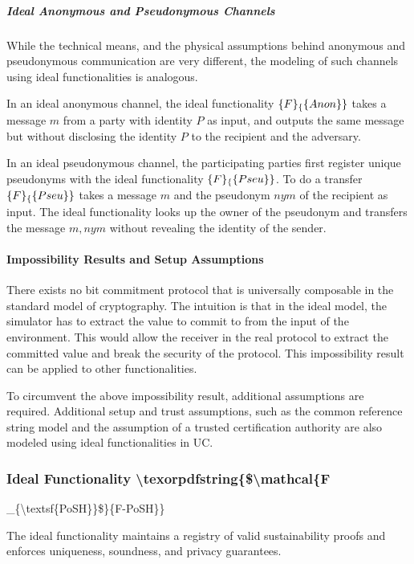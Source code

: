 \documentclass{article}
\begin{document}
\subparagraph{Ideal Anonymous and Pseudonymous Channels}

While the technical means, and the physical assumptions behind anonymous and
pseudonymous communication are very different, the modeling of such channels
using ideal functionalities is analogous.

In an ideal anonymous channel, the ideal functionality $\mathcal\{F\}_\{\mathsf\{Anon\}\}$
takes a message $m$ from a party with identity $P$ as input, and outputs the
same message but without disclosing the identity $P$ to the recipient and the
adversary.

In an ideal pseudonymous channel, the participating parties first register
unique pseudonyms with the ideal functionality $\mathcal\{F\}_\{\mathsf\{Pseu\}\}$. To
do a transfer $\mathcal\{F\}_\{\mathsf\{Pseu\}\}$ takes a message $m$ and the
pseudonym $nym$ of the recipient as input. The ideal functionality looks up the
owner of the pseudonym and transfers the message $m,nym$ without revealing the
identity of the sender.

\paragraph{Impossibility Results and Setup Assumptions}

There exists no bit commitment protocol that is universally composable in the
standard model of cryptography. The intuition is that in the ideal model, the
simulator has to extract the value to commit to from the input of the
environment. This would allow the receiver in the real protocol to extract the
committed value and break the security of the protocol. This impossibility
result can be applied to other functionalities.

To circumvent the above impossibility result, additional assumptions are
required. Additional setup and trust assumptions, such as the common reference
string model and the assumption of a trusted certification authority are also
modeled using ideal functionalities in UC.

\subsubsection{Ideal Functionality {\textbackslash}texorpdfstring\{\${\textbackslash}mathcal\{F}

\_\{{\textbackslash}textsf\{PoSH\}\}\$\}\{F-PoSH\}\}

The ideal functionality maintains a registry of valid sustainability proofs and
enforces uniqueness, soundness, and privacy guarantees.
\end{document}
